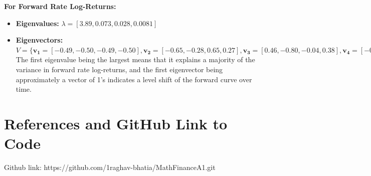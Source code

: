 \documentclass{article}
\begin{document}
\begin{enumerate}
   \textbf{For Forward Rate Log-Returns:}
    \begin{itemize}
        \item \textbf{Eigenvalues:} $\lambda = [3.89, 0.073, 0.028, 0.0081]$
        \item \textbf{Eigenvectors:} 
        $V = \{ \mathbf{v_1} = [-0.49, -0.50, -0.49, -0.50], \mathbf{v_2} = [-0.65, -0.28, 0.65, 0.27], \mathbf{v_3} = [0.46, -0.80, -0.04, 0.38], \mathbf{v_4} = [-0.34, 0.17, -0.57, 0.73] \}$
        The first eigenvalue being the largest means that it explains a majority of the variance in forward rate log-returns, and the first eigenvector being approximately a vector of 1's indicates a level shift of the forward curve over time.  
    \end{itemize}

\end{enumerate}

\section*{References and GitHub Link to Code}

Github link: https://github.com/1raghav-bhatia/MathFinanceA1.git
\end{document}
